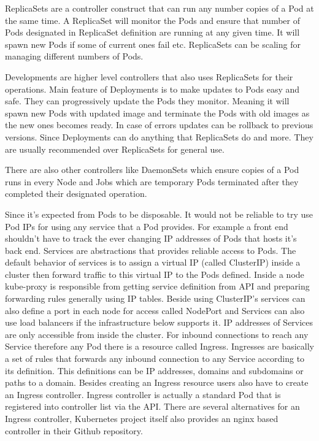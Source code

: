 \documentclass[12pt,oneandhalf,chaparabic,ceng,ms,eng,oneside,pntc]{gsufbe}
\begin{document}
ReplicaSets are a controller construct that can run any number copies of a Pod at the same time.  A 
ReplicaSet will monitor the Pods and ensure that number of Pods designated in ReplicaSet definition are
running at any given time.  It will spawn new Pods if some of current ones fail etc. ReplicaSets can
be scaling for managing different numbers of Pods.  

Developments are higher level controllers that also uses ReplicaSets for their operations.  Main feature
of Deployments is to make updates to Pods easy and safe.  They can progressively update the Pods they
monitor.  Meaning it will spawn new Pods with updated image and terminate the Pods with old images as
the new ones becomes ready.  In case of errors updates can be rollback to previous versions.  Since
Deployments can do anything that ReplicaSets do and more.  They are usually recommended over ReplicaSets
for general use.

There are also other controllers like DaemonSets which ensure copies of a Pod runs in every Node and
Jobs which are temporary Pods terminated after they completed their designated operation.

Since it’s expected from Pods to be disposable.  It would not be reliable to try use Pod IPs for using
any service that a Pod provides.  For example a front end shouldn’t have to track the ever changing IP
addresses of Pods that hosts it’s back end.  Services are abstractions that provides reliable access to
Pods.  The default behavior of services is to assign a virtual IP (called ClusterIP) inside a cluster
then forward traffic to this virtual IP to the Pods defined.  Inside a node kube-proxy is responsible
from getting service definition from API and preparing forwarding rules generally using IP tables.
Beside using ClusterIP’s services can also define a port in each node for access called NodePort and
Services can also use load balancers if the infrastructure below supports it.  
\cite{marmol_networking_2015}
IP addresses of Services are only accessible from inside the cluster.  For inbound connections to reach
any Service therefore any Pod there is a resource called Ingress.  Ingresses are basically a set of rules
that forwards any inbound connection to any Service according to its definition.  This definitions can
be IP addresses, domains and subdomains or paths to a domain.  Besides creating an Ingress resource
users also have to create an Ingress controller.  Ingress controller is actually a standard Pod that is
registered into controller list via the API.  There are several alternatives for an Ingress controller,
Kubernetes project itself also provides an nginx based controller in their Github repository.
\end{document}

